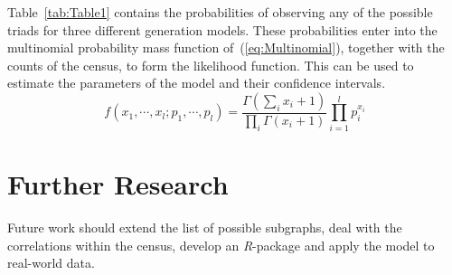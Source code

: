 \documentclass[conference]{IEEEtran}
\begin{document}
Table~\ref{tab:Table1} contains the probabilities of observing any of the possible triads for three different generation models. These probabilities enter into the multinomial probability mass function of~(\ref{eq:Multinomial}), together with the counts of the census, to form the likelihood function. This can be used to estimate the parameters of the model and their confidence intervals.
\begin{equation}
f(x_{1}, \cdots, x_{l} ; p_{1}, \cdots, p_{l}) = \frac{\Gamma(\sum_{i} x_{i}+1)}{\prod_{i} \Gamma(x_{i}+1)} \prod_{i=1}^{l} p_{i}^{x_{i}}
\label{eq:Multinomial}
\end{equation}

\section{Further Research}

Future work should extend the list of possible subgraphs, deal with the correlations within the census, develop an \mbox{\textit{R}-package} and apply the model to real-world data.



\end{document}
